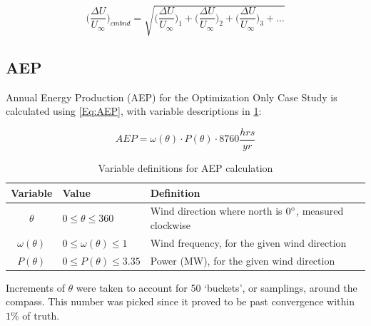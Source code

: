 \documentclass[12pt]{article}
\begin{document}
    \begin{equation}
    \label{Eq:CmbndWake}
        \bigg(\frac{\Delta U}{U_{\infty}}\bigg)_{cmbnd} = 
            \sqrt{
                \bigg(\frac{\Delta U}{U_{\infty}}\bigg)_1 +
                \bigg(\frac{\Delta U}{U_{\infty}}\bigg)_2 +
                \bigg(\frac{\Delta U}{U_{\infty}}\bigg)_3 +
                \dots}
    \end{equation}

\subsection{AEP}
    Annual Energy Production (AEP) for the Optimization Only Case Study is calculated using \cref{Eq:AEP}, with variable descriptions in \cref{tab:AEP}:
    
    \begin{equation}
        AEP = \omega (\theta) \cdot P (\theta) \cdot 8760 \frac{hrs}{yr}
        \label{Eq:AEP}
    \end{equation}
\vspace{-0.5cm}
    \begin{table}[H]
        \centering
        \begin{tabular}{|c|l|l|}
            \hline
            Variable & Value & Definition \\ \hline
            $\theta$ & $0 \leq \theta \leq 360$ & Wind direction where north is $0 \degree$, measured clockwise \\ \hline
            $\omega(\theta)$ & $0 \leq \omega(\theta) \leq 1$ & Wind frequency, for the given wind direction \\ \hline
            $P(\theta)$ & $0 \leq P(\theta) \leq 3.35 $ & Power (MW), for the given wind direction \\ \hline
        \end{tabular}
        \caption{Variable definitions for AEP calculation}
        \label{tab:AEP}
    \end{table}
    
    Increments of $\theta$ were taken to account for 50 `buckets', or samplings, around the compass. This number was picked since it proved to be past convergence within $1\%$ of truth.

\newpage
\section*{}


\end{document}
